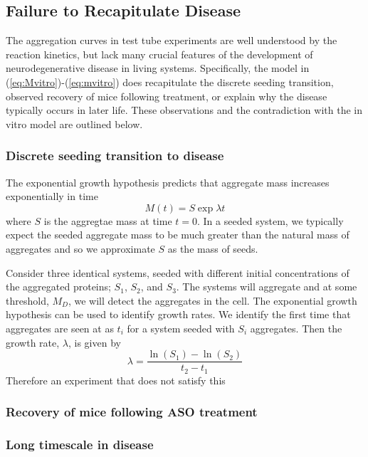 \subsection{Failure to Recapitulate Disease}

The aggregation curves in test tube experiments are well understood by the reaction kinetics, but lack many crucial features of the development of neurodegenerative disease in living systems. Specifically, the model in (\ref{eq:Mvitro})-(\ref{eq:mvitro}) does recapitulate the discrete seeding transition, observed recovery of mice following treatment, or explain why the disease typically occurs in later life. These observations and the contradiction with the in vitro model are outlined below.

\subsubsection{Discrete seeding transition to disease}


The exponential growth hypothesis predicts that aggregate mass increases exponentially in time
\begin{equation}
    M(t) = S\exp{\lambda t}
\end{equation}
where $S$ is the aggregtae mass at time $t=0$. In a seeded system, we typically expect the seeded aggregate mass to be much greater than the natural mass of aggregates and so we approximate $S$ as the mass of seeds.

Consider three identical systems, seeded with different initial concentrations of the aggregated proteins; $S_1$, $S_2$, and $S_3$. The systems will aggregate and at some threshold, $M_D$, we will detect the aggregates in the cell. The exponential growth hypothesis can be used to identify growth rates. We identify the first time that aggregates are seen at as $t_i$ for a system seeded with $S_i$ aggregates. Then the growth rate, $\lambda$, is given by
\begin{equation}
    \lambda = \frac{\ln(S_1)-\ln(S_2)}{t_2-t_1}
\end{equation}
Therefore an experiment that does not satisfy this

\subsubsection{Recovery of mice following ASO treatment}

\subsubsection{Long timescale in disease}

